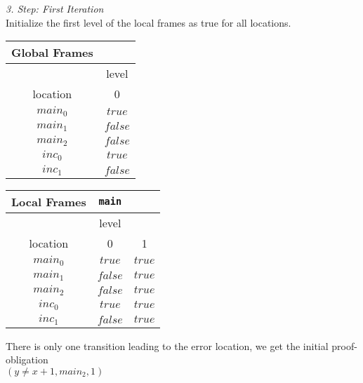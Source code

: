 \documentclass{article}
\begin{document}
	\vspace*{1em}
	\textsl{3. Step: First Iteration} \\
	Initialize the first level of the local frames as true for all locations. \\
	\begin{minipage}{.5\textwidth}
	\setlength\tabcolsep{0.35em}
	\begin{center}
		\begin{tabu}{cc}
			Global Frames \\
			\toprule
			& level \\
			\cmidrule(lr){2-2}
			location & 0 \\
			$main_0$ & $true$ \\
			$main_1$ & $false$ \\
			$main_2$ & $false$ \\
			$inc_0$ & $true$ \\
			$inc_1$ & $false$\\
			\bottomrule
		\end{tabu}
	\end{center}
	\end{minipage}
	\hfill
	\begin{minipage}{.4\textwidth}
		\setlength\tabcolsep{0.35em}
		\begin{center}
			\begin{tabu}{ccc}
				Local Frames & \texttt{main}\\
				\toprule
				& level \\
				\cmidrule(lr){2-2}
				location & 0 & 1 \\
				\cmidrule{1-3}
				$main_0$ & $true$ & $true$ \\
				$main_1$ & $false$ & $true$\\
				$main_2$ & $false$ & $true$\\
				$inc_0$ & $true$ & $true$\\
				$inc_1$ & $false$ & $true$\\
				\bottomrule
			\end{tabu}
		\end{center}	
	\end{minipage}
	
	\vspace*{1em}

	There is only one transition leading to the error location, we get the initial proof-obligation \\ $(y \neq x + 1, main_2, 1)$  \\ \\
	
\end{document}
